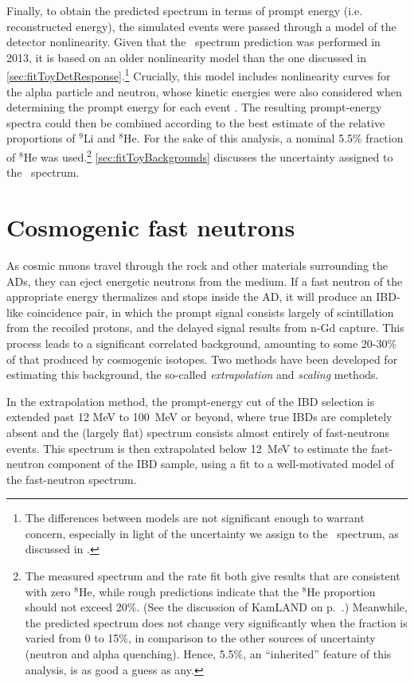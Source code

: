 \documentclass[../thesis.tex]{subfiles}
\begin{document}
Finally, to obtain the predicted spectrum in terms of prompt energy (i.e. reconstructed energy), the simulated events were passed through a model of the detector nonlinearity. Given that the \LiHe\ spectrum prediction was performed in 2013, it is based on an older nonlinearity model than the one discussed in \autoref{sec:fitToyDetResponse}.\footnote{The differences between models are not significant enough to warrant concern, especially in light of the uncertainty we assign to the \LiHe\ spectrum, as discussed in \cite{berkeley_toymc}.} Crucially, this model includes nonlinearity curves for the alpha particle and neutron, whose kinetic energies were also considered when determining the prompt energy for each event \cite{bcwNonlin}. The resulting prompt-energy spectra could then be combined according to the best estimate of the relative proportions of $^9$Li and $^8$He. For the sake of this analysis, a nominal 5.5\% fraction of $^8$He was used.\footnote{The measured spectrum and the rate fit both give results that are consistent with zero $^8$He, while rough predictions indicate that the $^8$He proportion should not exceed 20\%. (See the discussion of KamLAND on p.~\pageref{par:kamland_he8}.) Meanwhile, the predicted spectrum does not change very significantly when the fraction is varied from 0 to 15\%, in comparison to the other sources of uncertainty (neutron and alpha quenching). Hence, 5.5\%, an ``inherited'' feature of this analysis, is as good a guess as any.} \autoref{sec:fitToyBackgrounds} discusses the uncertainty assigned to the \LiHe\ spectrum.

\section{Cosmogenic fast neutrons}
\label{sec:bkgFastn}

As cosmic muons travel through the rock and other materials surrounding the ADs, they can eject energetic neutrons from the medium. If a fast neutron of the appropriate energy thermalizes and stops inside the AD, it will produce an IBD-like coincidence pair, in which the prompt signal consists largely of scintillation from the recoiled protons, and the delayed signal results from n-Gd capture. This process leads to a significant correlated background, amounting to some 20-30\% of that produced by cosmogenic isotopes. Two methods have been developed for estimating this background, the so-called \emph{extrapolation} and \emph{scaling} methods.

In the extrapolation method, the prompt-energy cut of the IBD selection is extended past 12 MeV to 100~MeV or beyond, where true IBDs are completely absent and the (largely flat) spectrum consists almost entirely of fast-neutrons events. This spectrum is then extrapolated below 12~MeV to estimate the fast-neutron component of the IBD sample, using a fit to a well-motivated model of the fast-neutron spectrum.
\end{document}
